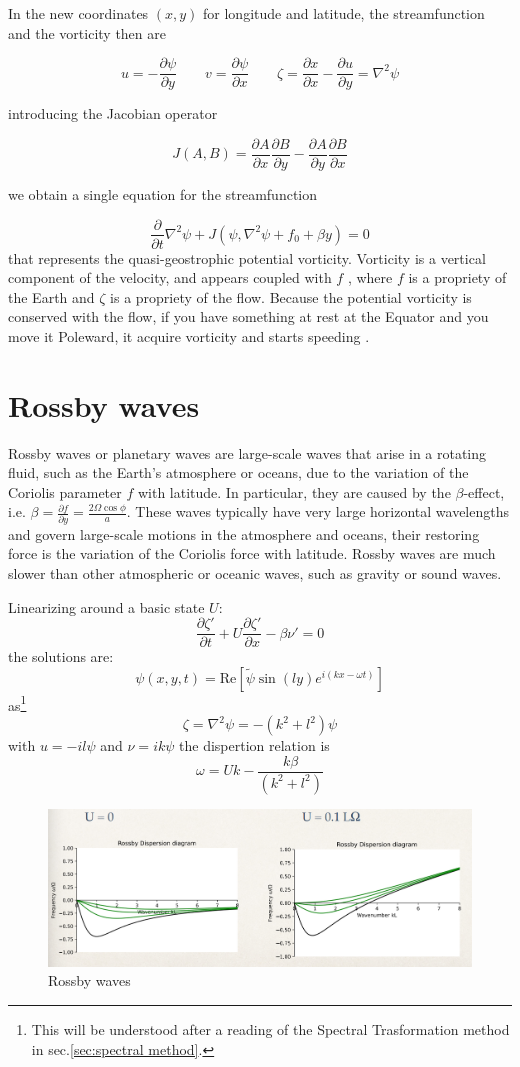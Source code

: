In the new coordinates \((x,y)\) for longitude and latitude, the
streamfunction and the vorticity then are

\[u=-\frac{\partial \psi}{\partial y}\qquad v=\frac{\partial \psi}{\partial x} \qquad
	\zeta = \frac{\partial x}{\partial x} -\frac{\partial u}{\partial y}=\nabla^2\psi\]

introducing the Jacobian operator

\[J(A,B) = \frac{\partial A}{\partial x}\frac{\partial B}{\partial y} - \frac{\partial A}{\partial y}\frac{\partial B}{\partial x}\]

we obtain a single equation for the streamfunction

\[\frac{\partial }{\partial t}\nabla^2\psi  + J(\psi, \nabla^2\psi +f_0 + \beta y) = 0\]
that represents the quasi-geostrophic potential vorticity.
Vorticity is a vertical component of the velocity, and appears coupled with $f$ , where $f$ is a propriety of the Earth and $\zeta$  is a propriety of the flow. Because the potential vorticity is conserved with the flow, if you have something at rest at the Equator and you move it Poleward, it acquire vorticity and starts speeding .


\section{Rossby waves}
Rossby waves or planetary waves are large-scale waves that arise in a rotating fluid, such as the Earth's atmosphere or oceans, due to the variation of the Coriolis parameter $f$ with latitude. In particular, they are caused by the $\beta$-effect, i.e. $\beta=\frac{\partial f}{\partial y}=\frac{2\Omega\cos\phi}{a}$. These waves typically have very large horizontal wavelengths and govern large-scale motions in the atmosphere and oceans, their restoring force is the variation of the Coriolis force with latitude. Rossby waves are much slower than other atmospheric or oceanic waves, such as gravity or sound waves.

Linearizing around a basic state $U$:
\begin{equation}
	\frac{\partial\zeta'}{\partial t}+U\frac{\partial\zeta'}{\partial x}-\beta\nu'=0
\end{equation}
the solutions are:
\begin{equation}
	\psi(x,y,t)=\text{Re}\left[\tilde{\psi}\sin(ly)e^{i(kx-\omega t)}\right]
\end{equation}
as\footnote{This will be understood after a reading of the Spectral Trasformation method in sec.\ref{sec:spectral method}.} $$\zeta=\nabla^2\psi=-(k^2+l^2)\psi$$
with $u=-il\psi$ and $\nu=ik\psi$
the dispertion relation is $$\omega=Uk-\frac{k\beta}{(k^2+l^2)}$$
\begin{figure}[htpb]
	\centering
	\includegraphics[width=0.5\linewidth]{upload/Screenshot 2024-11-21 162828.png}
	\caption{Rossby waves}
	\label{fig:ross waves}
\end{figure}

